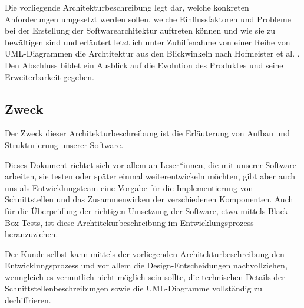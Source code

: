 \documentclass[enabledeprecatedfontcommands,fontsize=12pt,paper=a4,twoside,parskip=half]{scrartcl}
\begin{document}

Die vorliegende Architekturbeschreibung legt dar, welche konkreten Anforderungen umgesetzt werden sollen, welche Einflussfaktoren und Probleme bei der Erstellung der Softwarearchitektur auftreten können und wie sie zu bewältigen sind und erläutert letztlich unter Zuhilfenahme von einer Reihe von UML-Diagrammen die Archtitektur aus den Blickwinkeln nach Hofmeister et al. \cite{Hofmeister:1999:ASA:322640}. Den Abschluss bildet ein Ausblick auf die Evolution des Produktes und seine Erweiterbarkeit gegeben.

\subsection{Zweck}

  

Der Zweck dieser Architekturbeschreibung ist die Erläuterung von Aufbau und Strukturierung unserer Software. %

Dieses Dokument richtet sich vor allem an Leser*innen, die mit unserer Software arbeiten, sie testen oder später einmal weiterentwickeln möchten, gibt aber auch uns als Entwicklungsteam eine Vorgabe für die Implementierung von Schnittstellen und das Zusammenwirken der verschiedenen Komponenten. Auch für die Überprüfung der richtigen Umsetzung der Software, etwa mittels Black-Box-Tests, ist diese Archtitekurbeschreibung im Entwicklungsprozess heranzuziehen.

Der Kunde selbst kann mittels der vorliegenden Architekturbeschreibung den Entwicklungsprozess und vor allem die Design-Entscheidungen nachvollziehen, wenngleich es vermutlich nicht möglich sein sollte, die technischen Details der Schnittstellenbeschreibungen sowie die UML-Diagramme vollständig zu dechiffrieren. 
\end{document}

